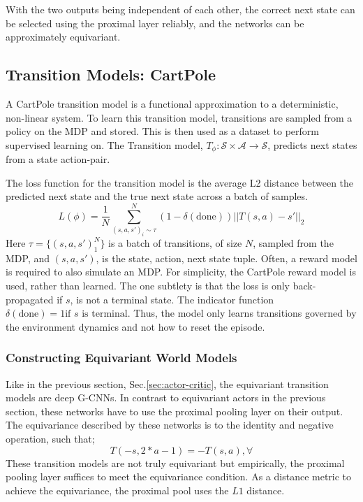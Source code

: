 With the two outputs being independent of each other, the correct next state can be selected using the proximal layer reliably, and the networks can be approximately equivariant.



\subsection{Transition Models: CartPole}
A CartPole transition model is a functional approximation to a deterministic, non-linear system.
To learn this transition model, transitions are sampled from a policy on the MDP and stored. This is then used as a dataset to perform supervised learning on. The Transition model, $T_\phi: \mathcal{S} \times \mathcal{A} \rightarrow \mathcal{S}$, predicts next states from a state action-pair.

The loss function for the transition model is the average L2 distance between the predicted next state and the true next state across a batch of samples.
\begin{equation}
	L(\phi) = \frac{1}{N}\sum^N_{(s, a, s')_i \sim \mathcal \tau} (1-\delta(\text{done}))||T(s, a) - s'||_2
\end{equation}
Here $\tau = \{(s, a , s')_1^N\}$ is a batch of transitions, of size $N$, sampled from the MDP, and $(s, a, s')$, is the state, action, next state tuple. Often, a reward model is required to also simulate an MDP. For simplicity, the CartPole reward model is used, rather than learned. The one subtlety is that the loss is only back-propagated if $s$, is not a terminal state. The indicator function $\delta(\text{done}) = 1 \text{if $s$ is terminal} $. Thus, the model only learns transitions governed by the environment dynamics and not how to reset the episode.


\subsubsection{Constructing Equivariant World Models}
Like in the previous section, Sec.\ref{sec:actor-critic}, the equivariant transition models are deep G-CNNs. In contrast to equivariant actors in the previous section, these networks have to use the proximal pooling layer on their output. The equivariance described by these networks is to the identity and negative operation, such that;
\begin{equation}
	T(- s, 2*a - 1) =  -T(s, a), \forall
\end{equation}
These transition models are not truly equivariant but empirically, the proximal pooling layer suffices to meet the equivariance condition. As a distance metric to achieve the equivariance, the proximal pool uses the $L1$ distance.

